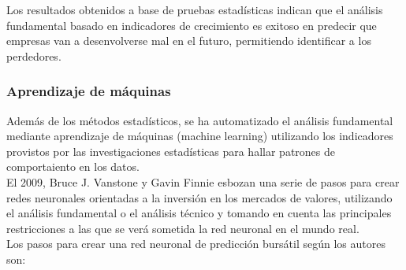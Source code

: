 Los resultados obtenidos a base de pruebas estadísticas indican que el análisis fundamental basado en indicadores de crecimiento es exitoso en predecir que empresas van a desenvolverse mal en el futuro, permitiendo identificar a los perdedores.\\



\subsubsection{Aprendizaje de m\'aquinas}


Adem\'as de los m\'etodos estad\'isticos, se ha automatizado el an\'alisis fundamental mediante aprendizaje de m\'aquinas (machine learning) utilizando los indicadores provistos por las investigaciones estad\'isticas para hallar patrones de comportaiento en los datos.\\

El 2009, Bruce J. Vanstone y Gavin Finnie \cite{Vanstone2009} esbozan una serie de pasos para crear redes neuronales orientadas a la inversión en los mercados de valores, utilizando el análisis fundamental o el análisis técnico y tomando en cuenta las principales restricciones a las que se verá sometida la red neuronal en el mundo real.\\

Los pasos para crear una red neuronal de predicción bursátil según los autores son:

